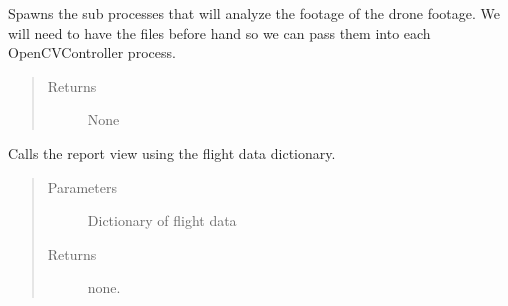 \documentclass[letterpaper,10pt,english]{sphinxmanual}
\begin{document}
\begin{fulllineitems}
\begin{fulllineitems}
\end{fulllineitems}


\begin{fulllineitems}
\label{\detokenize{index:src.Controllers.Program_Controller.Controller.start_analysis}}
Spawns the sub processes that will analyze the footage of the drone footage. We will need
to have the files before hand so we can pass them into each OpenCVController process.
\begin{quote}\begin{description}
\item[{Returns}] \leavevmode
None

\end{description}\end{quote}

\end{fulllineitems}


\begin{fulllineitems}
\label{\detokenize{index:src.Controllers.Program_Controller.Controller.transfer_complete}}
Calls the report view using the flight data dictionary.
\begin{quote}\begin{description}
\item[{Parameters}] \leavevmode
{} \textendash{} Dictionary of flight data

\item[{Returns}] \leavevmode
none.

\end{description}\end{quote}

\end{fulllineitems}



\end{fulllineitems}
\end{document}
